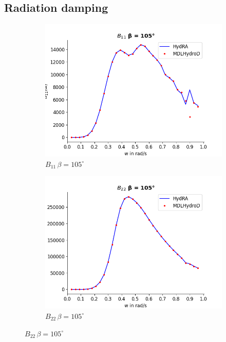 \subsection{Radiation damping}
\begin{figure}[H]
    \centering
    \begin{subfigure}[b]{0.49\textwidth}
        \includegraphics[width=\textwidth]{plots/kvlcc/radiation_damp/b11.png}
        \caption{$B_{11} \, \beta = 105^{\circ}$}
    \end{subfigure}
    \begin{subfigure}[b]{0.49\textwidth}
        \includegraphics[width=\textwidth]{plots/kvlcc/radiation_damp/b22.png}
        \caption{$B_{22} \, \beta = 105^{\circ}$}

\end{subfigure}
\end{figure}
